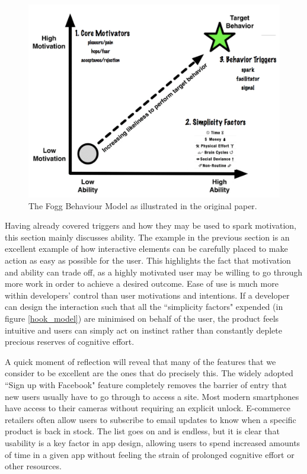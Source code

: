 \begin{figure}[h]
    \begin{center}
        \includegraphics[scale=0.3]{images/fogg_behaviour.png}
    \end{center}
    \caption{The Fogg Behaviour Model as illustrated in the original paper.}
    \label{fig:fogg_behaviour}
\end{figure}

Having already covered triggers and how they may be used to spark motivation, this section mainly discusses ability. The example in the previous section is an excellent example of how interactive elements can be carefully placed to make action as easy as possible for the user. This highlights the fact that motivation and ability can trade off, as a highly motivated user may be willing to go through more work in order to achieve a desired outcome. Ease of use is much more within developers' control than user motivations and intentions. If a developer can design the interaction such that all the ``simplicity factors" expended (in figure \ref{hook_model}) are minimised on behalf of the user, the product feels intuitive and users can simply act on instinct rather than constantly deplete precious reserves of cognitive effort.

A quick moment of reflection will reveal that many of the features that we consider to be excellent are the ones that do precisely this. The widely adopted ``Sign up with Facebook" feature completely removes the barrier of entry that new users usually have to go through to access a site. Most modern smartphones have access to their cameras without requiring an explicit unlock. E-commerce retailers often allow users to subscribe to email updates to know when a specific product is back in stock. The list goes on and is endless, but it is clear that usability is a key factor in app design, allowing users to spend increased amounts of time in a given app without feeling the strain of prolonged cognitive effort or other resources.

